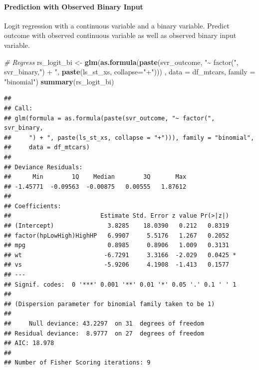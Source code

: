 \documentclass[
]{book}
\newenvironment{Shaded}{\begin{snugshade}}{\end{snugshade}}
\newcommand{\CommentTok}[1]{\textcolor[rgb]{0.56,0.35,0.01}{\textit{#1}}}
\newcommand{\DataTypeTok}[1]{\textcolor[rgb]{0.13,0.29,0.53}{#1}}
\newcommand{\KeywordTok}[1]{\textcolor[rgb]{0.13,0.29,0.53}{\textbf{#1}}}
\newcommand{\NormalTok}[1]{#1}
\newcommand{\StringTok}[1]{\textcolor[rgb]{0.31,0.60,0.02}{#1}}
\begin{document}
\hypertarget{prediction-with-observed-binary-input}{%
\paragraph{Prediction with Observed Binary Input}\label{prediction-with-observed-binary-input}}

Logit regression with a continuous variable and a binary variable. Predict outcome with observed continuous variable as well as observed binary input variable.

\begin{Shaded}
\begin{Highlighting}[]
\CommentTok{\# Regress}
\NormalTok{rs\_logit\_bi \textless{}{-}}\StringTok{ }\KeywordTok{glm}\NormalTok{(}\KeywordTok{as.formula}\NormalTok{(}\KeywordTok{paste}\NormalTok{(svr\_outcome,}
                                    \StringTok{"\textasciitilde{} factor("}\NormalTok{, svr\_binary,}\StringTok{") + "}\NormalTok{,}
                                    \KeywordTok{paste}\NormalTok{(ls\_st\_xs, }\DataTypeTok{collapse=}\StringTok{"+"}\NormalTok{)))}
\NormalTok{                   , }\DataTypeTok{data =}\NormalTok{ df\_mtcars, }\DataTypeTok{family =} \StringTok{"binomial"}\NormalTok{)}
\KeywordTok{summary}\NormalTok{(rs\_logit\_bi)}
\end{Highlighting}
\end{Shaded}

\begin{verbatim}
## 
## Call:
## glm(formula = as.formula(paste(svr_outcome, "~ factor(", svr_binary, 
##     ") + ", paste(ls_st_xs, collapse = "+"))), family = "binomial", 
##     data = df_mtcars)
## 
## Deviance Residuals: 
##      Min        1Q    Median        3Q       Max  
## -1.45771  -0.09563  -0.00875   0.00555   1.87612  
## 
## Coefficients:
##                         Estimate Std. Error z value Pr(>|z|)  
## (Intercept)               3.8285    18.0390   0.212   0.8319  
## factor(hpLowHigh)HighHP   6.9907     5.5176   1.267   0.2052  
## mpg                       0.8985     0.8906   1.009   0.3131  
## wt                       -6.7291     3.3166  -2.029   0.0425 *
## vs                       -5.9206     4.1908  -1.413   0.1577  
## ---
## Signif. codes:  0 '***' 0.001 '**' 0.01 '*' 0.05 '.' 0.1 ' ' 1
## 
## (Dispersion parameter for binomial family taken to be 1)
## 
##     Null deviance: 43.2297  on 31  degrees of freedom
## Residual deviance:  8.9777  on 27  degrees of freedom
## AIC: 18.978
## 
## Number of Fisher Scoring iterations: 9
\end{verbatim}
\end{document}
